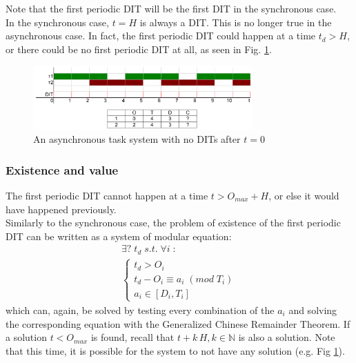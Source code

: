 \documentclass[a4paper,10pt]{article}
\begin{document}
Note that the first periodic DIT will be the first DIT in the synchronous case.\\

In the synchronous case, $t = H$ is always a DIT. This is no longer true in the asynchronous case. In fact, the first periodic DIT could happen at a time $t_d > H$, or there could be no first periodic DIT at all, as seen in Fig. \ref{fig:asyncNoDit}.

\begin{figure}[h]
\begin{center}
\includegraphics[width=0.75\textwidth]{figs/dit_asynchronousNoDit.png}
\caption{An asynchronous task system with no DITs after $t=0$}
\label{fig:asyncNoDit}
\end{center}
\end{figure}

\subsubsection{Existence and value}

The first periodic DIT cannot happen at a time $t > O_{max} + H$, or else it would have happened previously.\\

Similarly to the synchronous case, the problem of existence of the first periodic DIT can be written as a system of modular equation:
$$
\begin{array}{l}
	\exists ? \; t_d \; s.t. \; \forall i \; :\\
	\left\{
		\begin{array}{l}
		t_d > O_i \\
		t_d - O_i \equiv a_i \; (mod \; T_i) \\
		a_i \in [D_i, T_i]
	\end{array}
\right.
\end{array}
$$
which can, again, be solved by testing every combination of the $a_i$ and solving the corresponding equation with the Generalized Chinese Remainder Theorem. If a solution $t < O_{max}$ is found, recall that $t + k \, H, k \in \mathbb{N}$ is also a solution. Note that this time, it is possible for the system to not have any solution (e.g. Fig \ref{fig:asyncNoDit}).
\end{document}
